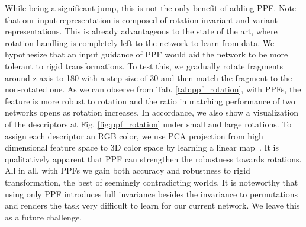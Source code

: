 \documentclass[10pt,twocolumn,letterpaper]{article}
\theoremstyle{break}
\begin{document}
While being a significant jump, this is not the only benefit of adding PPF. Note that our input representation is composed of  rotation-invariant and  variant representations. This is already advantageous to the state of the art, where rotation handling is completely left to the network to learn from data. We hypothesize that an input guidance of PPF would aid the network to be more tolerant to rigid transformations. To test this, we gradually rotate fragments around z-axis to 180 with a step size of 30 and then match the fragment to the non-rotated one.  As we can observe from Tab. \ref{tab:ppf_rotation}, with PPFs, the feature is more robust to rotation and the ratio in matching performance of two networks opens as rotation increases.  In accordance, we also show a visualization of the descriptors at Fig. \ref{fig:ppf_rotation} under small and large rotations. To assign each descriptor an RGB color, we use PCA projection from high dimensional feature space to 3D color space by learning a linear map~\cite{Khoury_2017_ICCV}. It is qualitatively apparent that PPF can strengthen the robustness towards rotations. All in all, with PPFs we gain both accuracy and robustness to rigid transformation, the best of seemingly contradicting worlds. It is noteworthy that using only PPF introduces full invariance besides the invariance to permutations and renders the task very difficult to learn for our current network. We leave this as a future challenge. 
\end{document}
